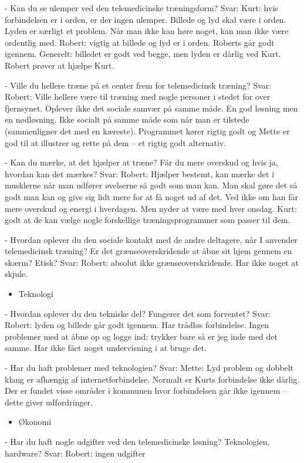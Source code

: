 -	Kan du se ulemper ved den telemedicinske træningsform?
Svar:
Kurt: hvis forbindelsen er i orden, er der ingen ulemper. Billede og lyd skal være i orden. Lyden er særligt et problem. Når man ikke kan høre noget, kan man ikke være ordentlig med. Robert: vigtig at billede og lyd er i orden. Roberts går godt igennem. Generelt: billedet er godt ved begge, men lyden er dårlig ved Kurt. Robert prøver at hjælpe Kurt.

-	Ville du hellere træne på et center frem for telemedicinsk træning?
Svar:
Robert: Ville hellere være til træning med nogle personer i stedet for over fjernsynet. Oplever ikke det sociale samvær på samme måde. En god løsning men en nødløsning. Ikke socialt på samme måde som når man er tilstede (sammenligner det med en kæreste). Programmet kører rigtig godt og Mette er god til at illustrer og rette på dem – et rigtig godt alternativ.

-	Kan du mærke, at det hjælper at træne? Får du mere overskud og hvis ja, hvordan
kan det mærkes?
Svar:
Robert: Hjælper bestemt, kan mærke det i musklerne når man udfører øvelserne så godt som man kan. Man skal gøre det så godt man kan og give sig lidt mere for at få noget ud af det. Ved ikke om han får mere overskud og energi i hverdagen. Men nyder at være med hver onsdag.
Kurt: godt at de kan vælge nogle forskellige træningsprogrammer som passer til dem.

-	Hvordan oplever du den sociale kontakt med de andre deltagere, når I anvender telemedicinsk
træning? Er det grænseoverskridende at åbne sit hjem gennem en skærm?
Etisk?
Svar:
Robert: absolut ikke grænseoverskridende. Har ikke noget at skjule.

\begin{itemize}
	\item Teknologi
\end{itemize}
-	Hvordan oplever du den tekniske del? Fungerer det som forventet?
Svar:
Robert: lyden og billede går godt igennem. Har trådløs forbindelse. Ingen problemer med at åbne op og logge ind: trykker bare så er jeg inde med det samme. Har ikke fået noget undervisning i at bruge det.

-	Har du haft problemer med teknologien?
Svar:
Mette: Lyd problem og dobbelt klang er afhængig af internetforbindelse. Normalt er Kurts forbindelse ikke dårlig. Der er fundet visse områder i kommunen hvor forbindelsen går ikke igennem – dette giver udfordringer.

\begin{itemize}
	\item Økonomi
\end{itemize}
-	Har du haft nogle udgifter ved den telemedicinske løsning? Teknologien, hardware?
Svar:
Robert: ingen udgifter

